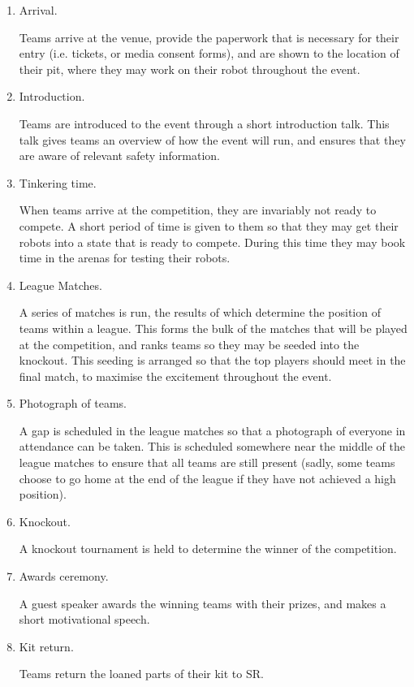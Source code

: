 \begin{enumerate}
\item Arrival.

  Teams arrive at the venue, provide the paperwork that is necessary for their entry (i.e. tickets, or media consent forms), and are shown to the location of their pit, where they may work on their robot throughout the event.

\item Introduction.

  Teams are introduced to the event through a short introduction talk.  This talk gives teams an overview of how the event will run, and ensures that they are aware of relevant safety information.

\item Tinkering time.

  When teams arrive at the competition, they are invariably not ready to compete.  A short period of time is given to them so that they may get their robots into a state that is ready to compete.  During this time they may book time in the arenas for testing their robots.

\item League Matches.

  A series of matches is run, the results of which determine the position of teams within a league.  This forms the bulk of the matches that will be played at the competition, and ranks teams so they may be seeded into the knockout.  This seeding is arranged so that the top players should meet in the final match, to maximise the excitement throughout the event.

\item Photograph of teams.

  A gap is scheduled in the league matches so that a photograph of everyone in attendance can be taken.  This is scheduled somewhere near the middle of the league matches to ensure that all teams are still present (sadly, some teams choose to go home at the end of the league if they have not achieved a high position).

\item Knockout.

  A knockout tournament is held to determine the winner of the competition.

\item Awards ceremony.

  A guest speaker awards the winning teams with their prizes, and makes a short motivational speech.

\item Kit return.

  Teams return the loaned parts of their kit to SR.
\end{enumerate}

